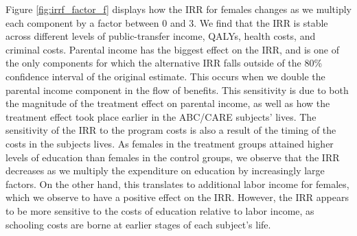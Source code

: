 \noindent Figure \ref{fig:irrf_factor_f} displays how the IRR for females
changes as we multiply each component by a factor between 0 and 3. We find that the IRR
is stable across different levels of public-transfer income, QALYs, health costs, and criminal 
costs. Parental income has the biggest effect on the IRR, 
and is one of the only components for which the alternative IRR falls outside of the 80\% confidence 
interval of the original estimate. This occurs when we double the parental income component in the
flow of benefits. 
 This sensitivity is due to both the magnitude of the
treatment effect on parental income, as well as how the treatment effect took place
earlier in the ABC/CARE subjects' lives. The sensitivity of the IRR to the program costs
is also a result of the timing of the costs in the subjects lives. As females in the treatment groups attained higher levels of education
than females in the control groups, we observe that the IRR decreases as we multiply the
expenditure on education by increasingly large factors. On the other hand, this translates
to additional labor income for females, which we observe to have a positive effect on the
IRR. However, the IRR appears to be more sensitive to the costs of education relative
to labor income, as schooling costs are borne at earlier stages of each subject's life. 


